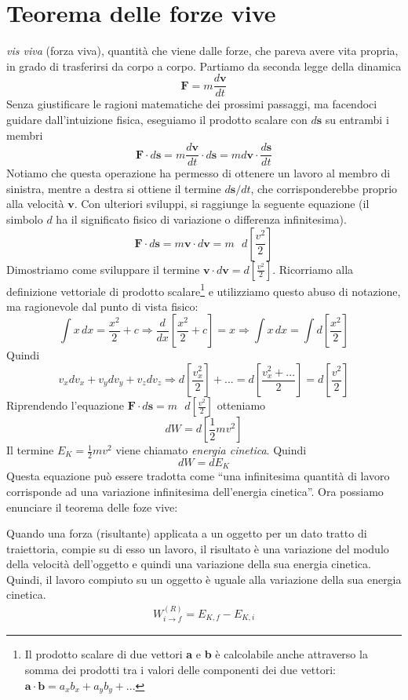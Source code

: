 \section{Teorema delle forze vive}
\textit{vis viva} (forza viva), quantità che viene dalle forze, che pareva avere
vita propria, in grado di trasferirsi da corpo a corpo.
Partiamo da seconda legge della dinamica
\[ \textbf{F} = m\frac{d\textbf{v}}{dt} \]
Senza giustificare le ragioni matematiche dei prossimi passaggi, ma facendoci
guidare dall'intuizione fisica, eseguiamo il prodotto scalare con $d\textbf{s}$
su entrambi i membri
\[ \textbf{F}\cdot d\textbf{s} = m\frac{d\textbf{v}}{dt}\cdot d\textbf{s} = m d\textbf{v}\cdot\frac{d\textbf{s}}{dt} \]
Notiamo che questa operazione ha permesso di ottenere un lavoro al membro di
sinistra, mentre a destra si ottiene il termine $d\mathbf{s}/dt$, che corrisponderebbe
proprio alla velocità $\textbf{v}$. Con ulteriori sviluppi, si raggiunge la
seguente equazione (il simbolo $d$ ha il significato fisico di variazione o
differenza infinitesima).
\[ \textbf{F}\cdot d\textbf{s} = m\textbf{v}\cdot d\textbf{v} = m\text{ }d\left[\frac{v^2}{2}\right] \]
Dimostriamo come sviluppare il termine $\textbf{v}\cdot d\textbf{v} = d\left[\frac{v^2}{2}\right]$.
Ricorriamo alla definizione vettoriale di prodotto scalare\footnote{Il prodotto scalare
di due vettori \textbf{a} e \textbf{b} è calcolabile anche attraverso la somma
dei prodotti tra i valori delle componenti dei due vettori: $\mathbf{a}\cdot\mathbf{b} = a_xb_x + a_yb_y + ...$}
e utilizziamo questo abuso di notazione, ma ragionevole dal punto di vista fisico:
\[ \int x \,dx =  \frac{x^2}{2} + c \Rightarrow \frac{d}{dx}\left[\frac{x^2}{2} + c\right] = x \Rightarrow \int x \,dx = \int d\left[\frac{x^2}{2}\right] \]
Quindi
\[ v_x dv_x + v_y dv_y + v_z dv_z \Rightarrow d\left[\frac{v_x^2}{2}\right] + ... = d\left[\frac{v_x^2 + ...}{2}\right] = d\left[\frac{v^2}{2}\right] \]
Riprendendo l'equazione $\mathbf{F}\cdot d\textbf{s} = m\text{ }d\left[\frac{v^2}{2}\right]$ otteniamo
\[ dW = d\left[\frac12 mv^2\right] \]
Il termine $E_K = \frac{1}{2}mv^2$ viene chiamato \textit{energia cinetica}. Quindi
\[ dW = dE_K \]
Questa equazione può essere tradotta come ``una infinitesima quantità di lavoro
corrisponde ad una variazione infinitesima dell'energia cinetica''. Ora possiamo
enunciare il teorema delle foze vive:
\vspace{8pt}
\begin{tcolorbox}[colback = red!30, colframe = red!30!black, title = {Teorema dell'energia cinetica (o delle forze vive)}]
    Quando una forza (risultante) applicata a un oggetto per un dato tratto di
    traiettoria, compie su di esso un lavoro, il risultato è una variazione del
    modulo della velocità dell'oggetto e quindi una variazione della sua energia
    cinetica. Quindi, il lavoro compiuto su un oggetto è uguale alla variazione
    della sua energia cinetica.
    \begin{align}
        W_{i\to f}^{(R)} = E_{K,f} - E_{K,i}
    \end{align}
\end{tcolorbox}
\vspace{5pt}

